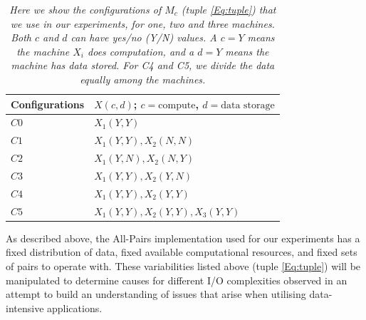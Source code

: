 \documentclass{rspublic}
\begin{document}
\begin{table}
\begin{center}
    \begin{tabular}{ | l | l |}
    \hline
    Configurations & $X(c,d)$; $c= \mbox{compute}$, $d=\mbox{data storage}$  \\ \hline
    $C0$ & $X_1(Y,Y)$  \\ \hline    
    $C1$ & $X_1(Y,Y), X_2(N, N)$  \\ \hline
    $C2$ & $X_1(Y,N), X_2(N,Y)$ \\ \hline
    $C3$ & $X_1(Y,Y), X_2(Y,N)$ \\ \hline
    $C4$ & $X_1(Y,Y), X_2(Y,Y)$ \\ \hline
    $C5$ & $X_1(Y,Y), X_2(Y,Y), X_3(Y,Y)$ \\ 
    \hline
    \end{tabular}
\end{center}
    \caption{\textit{Here we show the configurations of $M_c$ (tuple \ref{Eq:tuple}) that we use in our experiments, for one, two and three machines. Both $c$ and $d$ can have yes/no (Y/N) values. A $c = Y$ means the machine $X_i$ does computation, and a $d = Y$ means the machine has data stored. For C4 and C5, we divide the data equally among the machines.}}
    \label{Tab:Configs}
\end{table}

As described above, the All-Pairs implementation used for our
experiments has a fixed distribution of data, fixed available
computational resources, and fixed sets of pairs to operate with.
These variabilities listed above (tuple \ref{Eq:tuple}) will be manipulated to determine causes
for different I/O complexities observed in an attempt to build an
understanding of issues that arise when utilising data-intensive
applications. 
\end{document}
